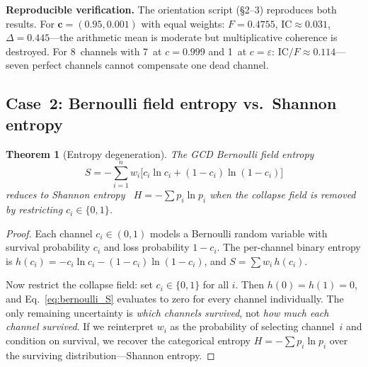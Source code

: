 \documentclass[
  aps,
  prd,
  twocolumn,
  superscriptaddress,
  nofootinbib,
  floatfix
]{revtex4-2}
\newtheorem{theorem}{Theorem}
\newcommand{\eps}{\varepsilon}
\newcommand{\beq}{\begin{equation}}
\newcommand{\eeq}{\end{equation}}
\newcommand{\tvec}{\mathbf{c}}
\newcommand{\IC}{\mathrm{IC}}
\begin{document}
\noindent\textbf{Reproducible verification.}
The orientation script (\S2--3) reproduces both results.
For $\tvec = (0.95, 0.001)$ with equal weights:
$F = 0.4755$, $\IC \approx 0.031$,
$\Delta = 0.445$---the arithmetic mean is moderate but
multiplicative coherence is destroyed.  For 8~channels with
7~at $c = 0.999$ and 1~at $c = \eps$:
$\IC/F \approx 0.114$---seven perfect channels cannot
compensate one dead channel.

\subsection{Case~2: Bernoulli field entropy vs.\ Shannon entropy}

\begin{theorem}[Entropy degeneration]
\label{thm:entropy}
The GCD Bernoulli field entropy
\beq
  S = -\!\sum_{i=1}^n w_i\bigl[
    c_i \ln c_i + (1{-}c_i)\ln(1{-}c_i)\bigr]
  \label{eq:bernoulli_S}
\eeq
reduces to Shannon entropy~\cite{shannon1948}
$H = -\sum p_i \ln p_i$ when the collapse field is removed by
restricting $c_i \in \{0, 1\}$.
\end{theorem}

\begin{proof}
Each channel $c_i \in (0,1)$ models a Bernoulli random
variable with survival probability $c_i$ and loss
probability $1 - c_i$.  The per-channel binary entropy is
$h(c_i) = -c_i \ln c_i - (1{-}c_i)\ln(1{-}c_i)$, and
$S = \sum w_i\, h(c_i)$.

Now restrict the collapse field: set $c_i \in \{0, 1\}$ for
all $i$.  Then $h(0) = h(1) = 0$, and Eq.~\ref{eq:bernoulli_S}
evaluates to zero for every channel individually.  The only
remaining uncertainty is \emph{which channels survived}, not
\emph{how much each channel survived}.  If we reinterpret
$w_i$ as the probability of selecting channel~$i$ and condition
on survival, we recover the categorical entropy
$H = -\sum p_i \ln p_i$ over the surviving
distribution---Shannon entropy.
\end{proof}
\end{document}
